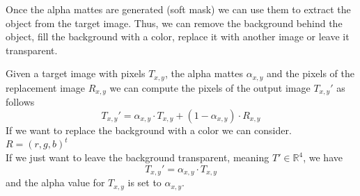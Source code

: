 \documentclass[a4paper]{article}
\begin{document}
Once the alpha mattes are generated (soft mask) we can use them
to extract the object from the target image.
Thus, we can remove the background behind the object,
fill the background with a color, replace it with another image
or leave it transparent.

Given a target image with pixels \(T_{x,y}\), the alpha
mattes \(\alpha_{x,y}\) and the pixels of the replacement image
\(R_{x,y}\) we can compute the pixels of the output image \(T_{x,y}'\)
as follows
\[
    T_{x,y}' = 
    \alpha_{x,y} \cdot T_{x,y} + (1 - \alpha_{x,y}) \cdot R_{x,y}
\]
If we want to replace the background with a color we can consider.
\(R={(r,g,b)}^t\) \\
If we just want to leave the background transparent, meaning
\(T' \in {\mathbb{R}}^4\), we have
\[
    T_{x,y}' = 
    \alpha_{x,y} \cdot T_{x,y}
\]
and the alpha value for \(T_{x,y}\) is set to \(\alpha_{x,y}\).
\end{document}
